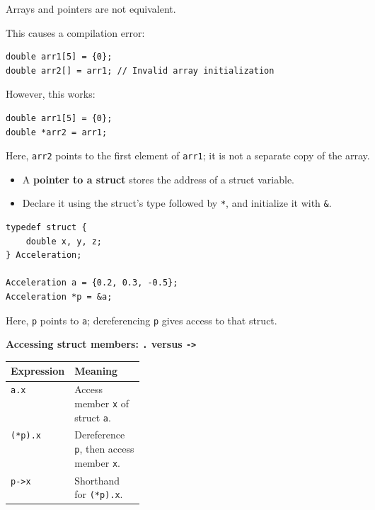 \documentclass[11pt,a4paper]{article}
\begin{document}

Arrays and pointers are not equivalent.

This causes a compilation error:
\begin{lstlisting}[style=cscode]
double arr1[5] = {0};
double arr2[] = arr1; // Invalid array initialization
\end{lstlisting}

However, this works:
\begin{lstlisting}[style=cscode]
double arr1[5] = {0};
double *arr2 = arr1;
\end{lstlisting}

Here, \texttt{arr2} points to the first element of \texttt{arr1};
it is not a separate copy of the array.


\begin{itemize}
    \item A \textbf{pointer to a struct} stores the address of a
          struct variable.
    \item Declare it using the struct's type followed by
          \texttt{*}, and initialize it with \texttt{\&}.
\end{itemize}

\begin{lstlisting}[style=cscode,
    morekeywords={[3]{Acceleration}}]
typedef struct {
    double x, y, z;
} Acceleration;

Acceleration a = {0.2, 0.3, -0.5};
Acceleration *p = &a;
\end{lstlisting}

Here, \texttt{p} points to \texttt{a}; dereferencing \texttt{p}
gives access to that struct.

\textbf{Accessing struct members: \texttt{.} versus \texttt{->}}

\begin{longtable}{@{}
    >{\raggedright\arraybackslash}p{0.22\linewidth}
    >{\raggedright\arraybackslash}p{}@{}}
\toprule
\textbf{Expression} & \textbf{Meaning} \\
\midrule
\endhead
\bottomrule
\endlastfoot
\texttt{a.x}
    & Access member \texttt{x} of struct \texttt{a}. \\
\texttt{(*p).x}
    & Dereference \texttt{p}, then access member \texttt{x}. \\
\texttt{p->x}
    & Shorthand for \texttt{(*p).x}. \\
\end{longtable}
\end{document}
